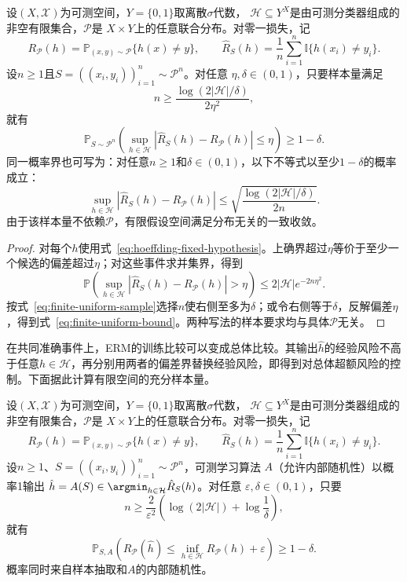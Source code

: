 \begin{theorem}[有限假设空间的一致收敛样本量界]
\label{thm:finite-uniform-convergence}
设$(X,\mathcal X)$为可测空间，$Y=\{0,1\}$取离散$\sigma$代数，
$\mathcal H\subseteq Y^X$是由可测分类器组成的非空有限集合，$\mathcal P$是
$X\times Y$上的任意联合分布。对零一损失，记
\[
 R_{\mathcal P}(h)=\mathbb P_{(x,y)\sim\mathcal P}\{h(x)\neq y\},\qquad
 \hat R_S(h)=\frac1n\sum_{i=1}^n\mathbb I\{h(x_i)\neq y_i\}.
\]
设$n\geq1$且$S=((x_i,y_i))_{i=1}^n\sim\mathcal P^n$。对任意
$\eta,\delta\in(0,1)$，只要样本量满足
\begin{equation}
 n\geq\frac{\log(2|\mathcal H|/\delta)}{2\eta^2},
 \label{eq:finite-uniform-sample}
\end{equation}
就有
\[
 \mathbb P_{S\sim\mathcal P^n}\left(
 \sup_{h\in\mathcal H}|\hat R_S(h)-R_{\mathcal P}(h)|\leq\eta
 \right)\geq1-\delta.
\]
同一概率界也可写为：对任意$n\geq1$和$\delta\in(0,1)$，以下不等式以至少$1-\delta$的概率成立：
\begin{equation}
 \sup_{h\in\mathcal H}|\hat R_S(h)-R_{\mathcal P}(h)|
 \leq\sqrt{\frac{\log(2|\mathcal H|/\delta)}{2n}}.
 \label{eq:finite-uniform-bound}
\end{equation}
由于该样本量不依赖$\mathcal P$，有限假设空间满足分布无关的一致收敛。
\end{theorem}

\begin{proof}
对每个$h$使用式~\eqref{eq:hoeffding-fixed-hypothesis}。上确界超过$\eta$等价于至少一个候选的偏差超过$\eta$；对这些事件求并集界，得到
\[
 \mathbb P\left(\sup_{h\in\mathcal H}|\hat R_S(h)-R_{\mathcal P}(h)|>\eta\right)
 \leq 2|\mathcal H|e^{-2n\eta^2}.
\]
按式~\eqref{eq:finite-uniform-sample}选择$n$使右侧至多为$\delta$；或令右侧等于$\delta$，反解偏差$\eta$，得到式~\eqref{eq:finite-uniform-bound}。两种写法的样本要求均与具体$\mathcal P$无关。
\end{proof}

在共同准确事件上，ERM的训练比较可以变成总体比较。其输出$\hat h$的经验风险不高于任意$h\in\mathcal H$，再分别用两者的偏差界替换经验风险，即得到对总体超额风险的控制。下面据此计算有限空间的充分样本量。

\begin{theorem}[有限假设空间的不可知PAC样本量界]
\label{thm:finite-agnostic-pac}
设$(X,\mathcal X)$为可测空间，$Y=\{0,1\}$取离散$\sigma$代数，
$\mathcal H\subseteq Y^X$是由可测分类器组成的非空有限集合，$\mathcal P$是
$X\times Y$上的任意联合分布。对零一损失，记
\[
 R_{\mathcal P}(h)=\mathbb P_{(x,y)\sim\mathcal P}\{h(x)\neq y\},\qquad
 \hat R_S(h)=\frac1n\sum_{i=1}^n\mathbb I\{h(x_i)\neq y_i\}.
\]
设$n\geq1$、$S=((x_i,y_i))_{i=1}^n\sim\mathcal P^n$，可测学习算法
$A$（允许内部随机性）以概率1输出
$\hat h=A(S)\in\argmin_{h\in\mathcal H}\hat R_S(h)$。对任意
$\varepsilon,\delta\in(0,1)$，只要
\begin{equation}
 n\geq\frac{2}{\varepsilon^2}
 \left(\log(2|\mathcal H|)+\log\frac1\delta\right),
 \label{eq:finite-agnostic-sample}
\end{equation}
就有
\[
 \mathbb P_{S,A}\left(
 R_{\mathcal P}(\hat h)\leq\inf_{h\in\mathcal H}R_{\mathcal P}(h)+\varepsilon
 \right)\geq1-\delta.
\]
概率同时来自样本抽取和$A$的内部随机性。
\end{theorem}

